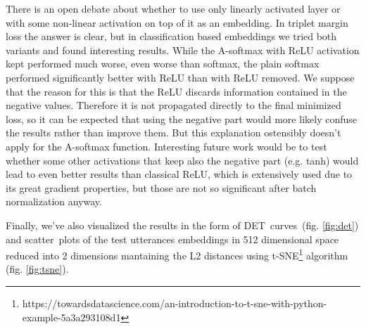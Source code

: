 \medskip
There is an open debate about whether to use only linearly activated layer or with some non-linear activation on top of it as an embedding. In triplet margin loss the answer is clear, but in classification based embeddings we tried both variants and found interesting results. While the A-softmax with ReLU activation kept performed much worse, even worse than softmax, the plain softmax performed significantly better with ReLU than with ReLU removed. We suppose that the reason for this is that the ReLU discards information contained in the negative values. Therefore it is not propagated directly to the final minimized loss, so it can be expected that using the negative part would more likely confuse the results rather than improve them. But this explanation ostensibly doesn't apply for the A-softmax function. Interesting future work would be to test whether some other activations that keep also the negative part (e.g. tanh) would lead to even better results than classical ReLU, which is extensively used due to its great gradient properties, but those are not so significant after batch normalization anyway.

\medskip
Finally, we've also visualized the results in the form of DET~curves~(fig. \ref{fig:det}) and scatter~plots of the test utterances embeddings in 512 dimensional space reduced into 2 dimensions mantaining the L2 distances using t-SNE\footnote{https://towardsdatascience.com/an-introduction-to-t-sne-with-python-example-5a3a293108d1} algorithm (fig. \ref{fig:tsne}).

